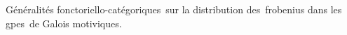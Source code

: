 
\begin{flushright}
Généralités fonctoriello-catégoriques\
sur la distribution des\
frobenius dans les gpes\
de Galois motiviques.
\end{flushright}

